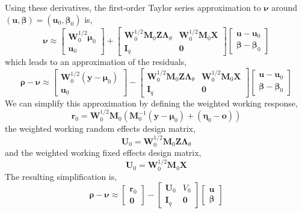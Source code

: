 \documentclass{jss}
\begin{document}
Using these derivatives, the first-order Taylor series approximation
to $\bm\nu$ around $(\bm u, \bm\beta) = (\bm u_0, \bm\beta_0)$ is,
\begin{equation}
\bm\nu \approx
\begin{bmatrix}
\bm W_0^{1/2}\bm \mu_0 \\
\bm u_0
\end{bmatrix} + 
\begin{bmatrix}
\bm W_0^{1/2}\bm M_0 \bm Z \bm\Lambda_\theta & \bm W_0^{1/2}\bm M_0 \bm X \\
\bm I_q & \bm 0
\end{bmatrix}
\begin{bmatrix}
\bm u - \bm u_0 \\
\bm\beta - \bm\beta_0 
\end{bmatrix}
\end{equation}
which leads to an approximation of the residuals,
\begin{equation}
\bm\rho - \bm\nu \approx
\begin{bmatrix}
\bm W_0^{1/2}(\bm y - \bm\mu_0) \\
\bm u_0
\end{bmatrix} - 
\begin{bmatrix}
\bm W_0^{1/2}\bm M_0 \bm Z \bm\Lambda_\theta & \bm W_0^{1/2}\bm M_0 \bm X \\
\bm I_q & \bm 0
\end{bmatrix}
\begin{bmatrix}
\bm u - \bm u_0 \\
\bm\beta - \bm\beta_0 
\end{bmatrix}
\end{equation}
We can simplify this approximation by defining the weighted working
response,
\begin{equation}
\bm r_0 = \bm W_0^{1/2} \bm M_0 (\bm M_0^{-1} (\bm y - \bm\mu_0) +
(\bm\eta_0 - \bm o))
\label{eq:weightedworkingresiduals}
\end{equation}
the weighted working random effects design matrix,
\begin{equation}
\bm U_0 = \bm W_0^{1/2} \bm M_0 \bm Z \bm\Lambda_\theta
\end{equation}
and the weighted working fixed effects design matrix,
\begin{equation}
\bm U_0 = \bm W_0^{1/2} \bm M_0 \bm X
\end{equation}
The resulting simplification is,
\begin{equation}
\bm\rho - \bm\nu \approx
\begin{bmatrix}
\bm r_0 \\
\bm 0
\end{bmatrix} - 
\begin{bmatrix}
\bm U_0 & V_0 \\
\bm I_q & \bm 0
\end{bmatrix}
\begin{bmatrix}
\bm u \\
\bm\beta
\end{bmatrix}
\end{equation}
\end{document}
